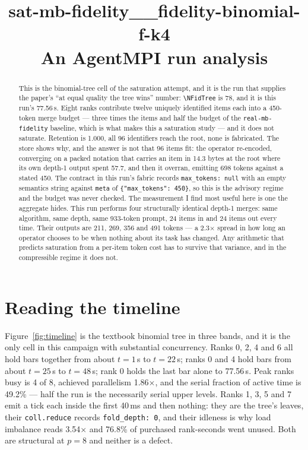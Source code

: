 \documentclass[11pt]{article}
\title{\textbf{sat-mb-fidelity\_\_fidelity-binomial-f-k4}\\[2pt]\large An AgentMPI run analysis}
\author{}
\date{}
\begin{document}
\maketitle

\begin{abstract}
This is the binomial-tree cell of the saturation attempt, and it is the run that supplies
the paper's ``at equal quality the tree wins'' number: \texttt{\textbackslash NFidTree} is
78, and it is this run's 77.56\,s. Eight ranks contribute twelve uniquely identified items
each into a 450-token merge budget --- three times the items and half the budget of the
\texttt{real-mb-fidelity} baseline, which is what makes this a saturation study --- and it
does not saturate. Retention is 1.000, all 96 identifiers reach the root, none is
fabricated. The store shows why, and the answer is not that 96 items fit: the operator
re-encoded, converging on a packed notation that carries an item in 14.3 bytes at the root
where its own depth-1 output spent 57.7, and then it overran, emitting 698 tokens against
a stated 450. The contract in this run's fabric records \texttt{max\_tokens: null} with an
empty semantics string against \texttt{meta} of \texttt{\{"max\_tokens": 450\}}, so this is
the advisory regime and the budget was never checked. The measurement I find most useful
here is one the aggregate hides. This run performs four structurally identical depth-1
merges: same algorithm, same depth, same 933-token prompt, 24 items in and 24 items out
every time. Their outputs are 211, 269, 356 and 491 tokens --- a 2.3$\times$ spread in how
long an operator chooses to be when nothing about its task has changed. Any arithmetic that
predicts saturation from a per-item token cost has to survive that variance, and in the
compressible regime it does not.
\end{abstract}



\section{Reading the timeline}

Figure~\ref{fig:timeline} is the textbook binomial tree in three bands, and it is the only
cell in this campaign with substantial concurrency. Ranks 0, 2, 4 and 6 all hold bars
together from about $t=1$\,s to $t=22$\,s; ranks 0 and 4 hold bars from about $t=25$\,s to
$t=48$\,s; rank 0 holds the last bar alone to 77.56\,s. Peak ranks busy is 4 of 8, achieved
parallelism 1.86$\times$, and the serial fraction of active time is 49.2\% --- half the run
is the necessarily serial upper levels. Ranks 1, 3, 5 and 7 emit a tick each inside the
first 40\,ms and then nothing: they are the tree's leaves, their \texttt{coll.reduce}
records \texttt{fold\_depth: 0}, and their idleness is why load imbalance reads
3.54$\times$ and 76.8\% of purchased rank-seconds went unused. Both are structural at $p=8$
and neither is a defect.
\end{document}
